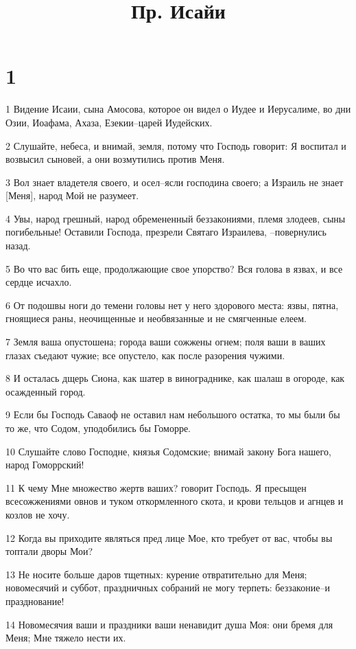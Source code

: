 

\title{Пр. Исайи}


\chapter{1}

\par 1 Видение Исаии, сына Амосова, которое он видел о Иудее и Иерусалиме, во дни Озии, Иоафама, Ахаза, Езекии--царей Иудейских.
\par 2 Слушайте, небеса, и внимай, земля, потому что Господь говорит: Я воспитал и возвысил сыновей, а они возмутились против Меня.
\par 3 Вол знает владетеля своего, и осел--ясли господина своего; а Израиль не знает [Меня], народ Мой не разумеет.
\par 4 Увы, народ грешный, народ обремененный беззакониями, племя злодеев, сыны погибельные! Оставили Господа, презрели Святаго Израилева, --повернулись назад.
\par 5 Во что вас бить еще, продолжающие свое упорство? Вся голова в язвах, и все сердце исчахло.
\par 6 От подошвы ноги до темени головы нет у него здорового места: язвы, пятна, гноящиеся раны, неочищенные и необвязанные и не смягченные елеем.
\par 7 Земля ваша опустошена; города ваши сожжены огнем; поля ваши в ваших глазах съедают чужие; все опустело, как после разорения чужими.
\par 8 И осталась дщерь Сиона, как шатер в винограднике, как шалаш в огороде, как осажденный город.
\par 9 Если бы Господь Саваоф не оставил нам небольшого остатка, то мы были бы то же, что Содом, уподобились бы Гоморре.
\par 10 Слушайте слово Господне, князья Содомские; внимай закону Бога нашего, народ Гоморрский!
\par 11 К чему Мне множество жертв ваших? говорит Господь. Я пресыщен всесожжениями овнов и туком откормленного скота, и крови тельцов и агнцев и козлов не хочу.
\par 12 Когда вы приходите являться пред лице Мое, кто требует от вас, чтобы вы топтали дворы Мои?
\par 13 Не носите больше даров тщетных: курение отвратительно для Меня; новомесячий и суббот, праздничных собраний не могу терпеть: беззаконие--и празднование!
\par 14 Новомесячия ваши и праздники ваши ненавидит душа Моя: они бремя для Меня; Мне тяжело нести их.
